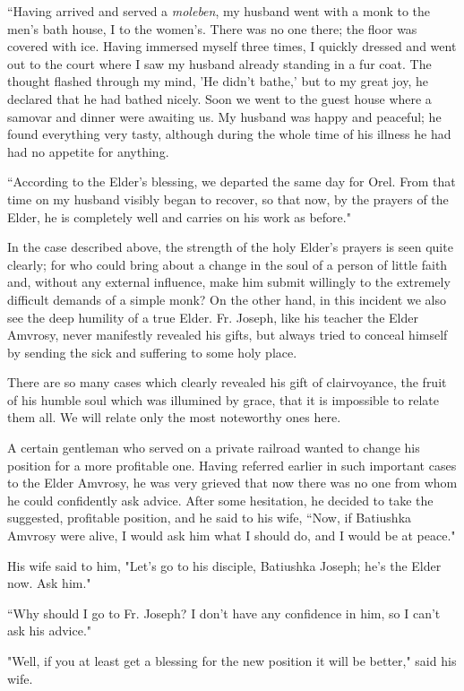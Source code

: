 “Having arrived and served a \textit{moleben}, my husband went with a monk to the men's bath house, I to the women's. There was no one there; the floor was covered with ice. Having immersed myself three times, I quickly dressed and went out to the court where I saw my husband already standing in a fur coat. The thought flashed through my mind, 'He didn't bathe,' but to my great joy, he declared that he had bathed nicely. Soon we went to the guest house where a samovar and dinner were awaiting us. My husband was happy and peaceful; he found everything very tasty, although during the whole time of his illness he had had no appetite for anything.

“According to the Elder's blessing, we departed the same day for Orel. From that time on my husband visibly began to recover, so that now, by the prayers of the Elder, he is completely well and carries on his work as before."

In the case described above, the strength of the holy Elder's prayers is seen quite clearly; for who could bring about a change in the soul of a person of little faith and, without any external influence, make him submit willingly to the extremely difficult demands of a simple monk? On the other hand, in this incident we also see the deep humility of a true Elder. Fr. Joseph, like his teacher the Elder Amvrosy, never manifestly revealed his gifts, but always tried to conceal himself by sending the sick and suffering to some holy place.

There are so many cases which clearly revealed his gift of clairvoyance, the fruit of his humble soul which was illumined by grace, that it is impossible to relate them all. We will relate only the most noteworthy ones here.

A certain gentleman who served on a private railroad wanted to change his position for a more profitable one. Having referred earlier in such important cases to the Elder Amvrosy, he was very grieved that now there was no one from whom he could confidently ask advice. After some hesitation, he decided to take the suggested, profitable position, and he said to his wife, “Now, if Batiushka Amvrosy were alive, I would ask him what I should do, and I would be at peace."

His wife said to him, "Let's go to his disciple, Batiushka Joseph; he's the Elder now. Ask him."

“Why should I go to Fr. Joseph? I don't have any confidence in him, so I can't ask his advice."

"Well, if you at least get a blessing for the new position it will be better," said his wife.

